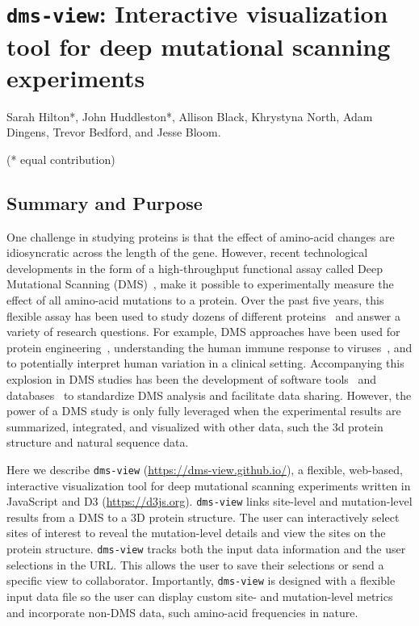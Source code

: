 \chapter{\texttt{dms-view}: Interactive visualization tool for deep mutational scanning experiments}

Sarah Hilton*, John Huddleston*, Allison Black, Khrystyna North, Adam Dingens, Trevor Bedford, and Jesse Bloom.

(* equal contribution)

\clearpage

\section{Summary and Purpose}

One challenge in studying proteins is that the effect of amino-acid changes are idiosyncratic across the length of the gene.
However, recent technological developments in the form of a high-throughput functional assay called Deep Mutational Scanning (DMS)~\cite{fowler2014deep}, make it possible to experimentally measure the effect of all amino-acid mutations to a protein.
Over the past five years, this flexible assay has been used to study dozens of different proteins~\cite{esposito2019mavedb} and answer a variety of research questions.
For example, DMS approaches have been used for protein engineering~\cite{wrenbeck2017deep}, understanding the human immune response to viruses~\cite{lee2019mapping}, and to potentially interpret human variation in a clinical setting\cite{starita2017variant, gelman2019recommendations}.
Accompanying this explosion in DMS studies has been the development of software tools~\cite{bloom2015software,rubin2017statistical} and databases~\cite{esposito2019mavedb} to standardize DMS analysis and facilitate data sharing.
However, the power of a DMS study is only fully leveraged when the experimental results are summarized, integrated, and visualized with other data, such the 3d protein structure and natural sequence data.

Here we describe \texttt{dms-view} (\url{https://dms-view.github.io/}), a flexible, web-based, interactive visualization tool for deep mutational scanning experiments written in JavaScript and D3 (\url{https://d3js.org}).
\texttt{dms-view} links site-level and mutation-level results from a DMS to a 3D protein structure.
The user can interactively select sites of interest to reveal the mutation-level details and view the sites on the protein structure.
\texttt{dms-view} tracks both the input data information and the user selections in the URL.
This allows the user to save their selections or send a specific view to collaborator.
Importantly, \texttt{dms-view} is designed with a flexible input data file so the user can display custom site- and mutation-level metrics and incorporate non-DMS data, such amino-acid frequencies in nature.


